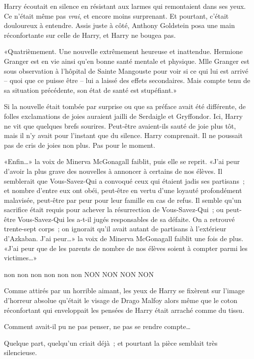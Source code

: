Harry écoutait en silence en résistant aux larmes qui remontaient dans ses yeux. Ce n'était même pas \emph{vrai}, et encore moins surprenant. Et pourtant, c'était douloureux à entendre. Assis juste à côté, Anthony Goldstein posa une main réconfortante sur celle de Harry, et Harry ne bougea pas.

«Quatrièmement. Une nouvelle extrêmement heureuse et inattendue. Hermione Granger est en vie ainsi qu'en bonne santé mentale et physique. Mlle Granger est sous observation à l'hôpital de Sainte Mangouste pour voir si ce qui lui est arrivé -- quoi que ce puisse être -- lui a laissé des effets secondaires. Mais compte tenu de sa situation précédente, son état de santé est stupéfiant.»

Si la nouvelle était tombée par surprise ou que sa préface avait été différente, de folles exclamations de joies auraient jailli de Serdaigle et Gryffondor. Ici, Harry ne vit que quelques brefs sourires. Peut-être avaient-ils sauté de joie plus tôt, mais il n'y avait pour l'instant que du silence. Harry comprenait. Il ne poussait pas de cris de joies non plus. Pas pour le moment.

«Enfin…» la voix de Minerva McGonagall faiblit, puis elle se reprit. «J'ai peur d'avoir la plus grave des nouvelles à annoncer à certains de nos élèves. Il semblerait que Vous-Savez-Qui a convoqué ceux qui étaient jadis ses partisans~; et nombre d'entre eux ont obéi, peut-être en vertu d'une loyauté profondément malavisée, peut-être par peur pour leur famille en cas de refus. Il semble qu'un sacrifice était requis pour achever la résurrection de Vous-Savez-Qui~; ou peut-être Vous-Savez-Qui les a-t-il jugés responsables de sa défaite. On a retrouvé trente-sept corps~; on ignorait qu'il avait autant de partisans à l'extérieur d'Azkaban. J'ai peur…» la voix de Minerva McGonagall faiblit une fois de plus. «J'ai peur que de les parents de nombre de nos élèves soient à compter parmi les victimes…»

non non non non non non NON NON NON NON

Comme attirés par un horrible aimant, les yeux de Harry se fixèrent sur l'image d'horreur absolue qu'était le visage de Drago Malfoy alors même que le coton réconfortant qui enveloppait les pensées de Harry était arraché comme du tissu.

Comment avait-il pu ne pas penser, ne pas se rendre compte…

Quelque part, quelqu'un criait déjà~; et pourtant la pièce semblait très silencieuse.

